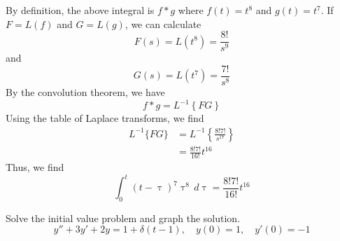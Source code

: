 \documentclass[11pt, titlepage]{article}
\begin{document}
    \begin{solution}
        By definition, the above integral is $f * g$ where $f(t) = t^{8}$ and
        $g(t) = t^{7}$. If $F = L(f)$ and $G = L(g)$, we can calculate
        \[
            F(s) = L(t^{8}) = \frac{8!}{s^{9}}
        \] 
        and
        \[
            G(s) = L(t^{7}) = \frac{7!}{s^{8}}
        \] 
        By the convolution theorem, we have
        \[
            f * g = L^{-1} \left\{ FG \right\}
        \] 
        Using the table of Laplace transforms, we find
        \begin{align*}
            L^{-1} \{ FG \} &= L^{-1} \left\{ \frac{8! 7!}{s^{17}}\right\} \\
                           &= \frac{8! 7!}{16!} t^{16}
        \end{align*}
        Thus, we find
        \[
            \int_{0}^{t} (t - \uptau)^{7} \uptau^{8} \, d\uptau = \frac{8!
            7!}{16!} t^{16}
        \] 
    \end{solution}
    \pagebreak

    \begin{problem}[Trench 8.7.9]
        Solve the initial value problem and graph the solution.
        \[
            y'' + 3y' + 2y = 1 + \delta(t - 1), \quad y(0) = 1, \quad y'(0) = -1
        \] 
    \end{problem}
\end{document}
